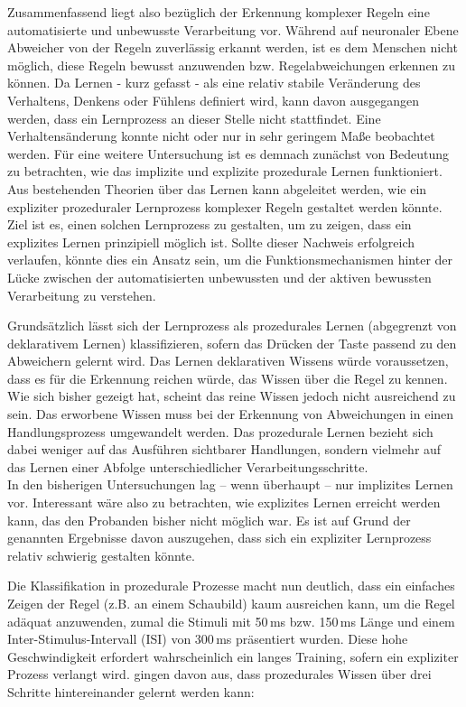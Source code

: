 \documentclass[doc,a4paper,12pt]{apa6}
\begin{document}
Zusammenfassend liegt also bezüglich der Erkennung komplexer Regeln eine automatisierte und unbewusste Verarbeitung vor. Während auf neuronaler Ebene Abweicher von der Regeln zuverlässig erkannt werden, ist es dem Menschen nicht möglich, diese Regeln bewusst anzuwenden bzw. Regelabweichungen erkennen zu können. Da Lernen - kurz gefasst - als eine relativ stabile Veränderung des Verhaltens, Denkens oder Fühlens definiert wird, kann davon ausgegangen werden, dass ein Lernprozess an dieser Stelle nicht stattfindet. Eine Verhaltensänderung konnte nicht oder nur in sehr geringem Maße beobachtet werden. Für eine weitere Untersuchung ist es demnach zunächst von Bedeutung zu betrachten, wie das implizite und explizite prozedurale Lernen funktioniert. Aus bestehenden Theorien über das Lernen kann abgeleitet werden, wie ein expliziter prozeduraler Lernprozess komplexer Regeln gestaltet werden könnte. Ziel ist es, einen solchen Lernprozess zu gestalten, um zu zeigen, dass ein explizites Lernen prinzipiell möglich ist. Sollte dieser Nachweis erfolgreich verlaufen, könnte dies ein Ansatz sein, um die Funktionsmechanismen hinter der Lücke zwischen der automatisierten unbewussten und der aktiven bewussten Verarbeitung zu verstehen.


Grundsätzlich lässt sich der Lernprozess als prozedurales Lernen (abgegrenzt von deklarativem Lernen) klassifizieren, sofern das Drücken der Taste passend zu den Abweichern gelernt wird. Das Lernen deklarativen Wissens würde voraussetzen, dass es für die Erkennung reichen würde, das Wissen über die Regel zu kennen. Wie sich bisher gezeigt hat, scheint das reine Wissen jedoch nicht ausreichend zu sein. Das erworbene Wissen muss bei der Erkennung von Abweichungen in einen Handlungsprozess umgewandelt werden. Das prozedurale Lernen bezieht sich dabei weniger auf das Ausführen sichtbarer Handlungen, sondern vielmehr auf das Lernen einer Abfolge unterschiedlicher Verarbeitungsschritte.\\
In den bisherigen Untersuchungen lag – wenn überhaupt – nur implizites Lernen vor. Interessant wäre also zu betrachten, wie explizites Lernen erreicht werden kann, das den Probanden bisher nicht möglich war. Es ist auf Grund der genannten Ergebnisse davon auszugehen, dass sich ein expliziter Lernprozess relativ schwierig gestalten könnte.

Die Klassifikation in prozedurale Prozesse macht nun deutlich, dass ein einfaches Zeigen der Regel (z.B. an einem Schaubild) kaum ausreichen kann, um die Regel adäquat anzuwenden, zumal die Stimuli mit 50\,ms bzw. 150\,ms Länge und einem Inter-Stimulus-Intervall (ISI) von 300\,ms präsentiert wurden. Diese hohe Geschwindigkeit erfordert wahrscheinlich ein langes Training, sofern ein expliziter Prozess verlangt wird. \textcite{fitts1967human} gingen davon aus, dass prozedurales Wissen über drei Schritte hintereinander gelernt werden kann:
\end{document}
